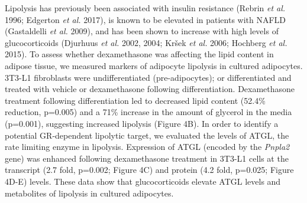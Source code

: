 \documentclass[11pt]{article} %
\begin{document}
Lipolysis has previously been associated with insulin resistance (Rebrin
\emph{et al.} 1996; Edgerton \emph{et al.} 2017), is known to be
elevated in patients with NAFLD (Gastaldelli \emph{et al.} 2009), and
has been shown to increase with high levels of glucocorticoids (Djurhuus
\emph{et al.} 2002, 2004; Kršek \emph{et al.} 2006; Hochberg \emph{et
al.} 2015). To assess whether dexamethasone was affecting the lipid
content in adipose tissue, we measured markers of adipocyte lipolysis in
cultured adipocytes. 3T3-L1 fibroblasts were undifferentiated
(pre-adipocytes); or differentiated and treated with vehicle or
dexamethasone following differentiation. Dexamethasone treatment
following differentiation led to decreased lipid content (52.4\%
reduction, p=0.005) and a 71\% increase in the amount of glycerol in the
media (p=0.001), suggesting increased lipolysis (Figure 4B). In order to
identify a potential GR-dependent lipolytic target, we evaluated the
levels of ATGL, the rate limiting enzyme in lipolysis. Expression of
ATGL (encoded by the \emph{Pnpla2} gene) was enhanced following
dexamethasone treatment in 3T3-L1 cells at the transcript (2.7 fold,
p=0.002; Figure 4C) and protein (4.2 fold, p=0.025; Figure 4D-E) levels.
These data show that glucocorticoids elevate ATGL levels and metabolites
of lipolysis in cultured adipocytes.
\end{document}
